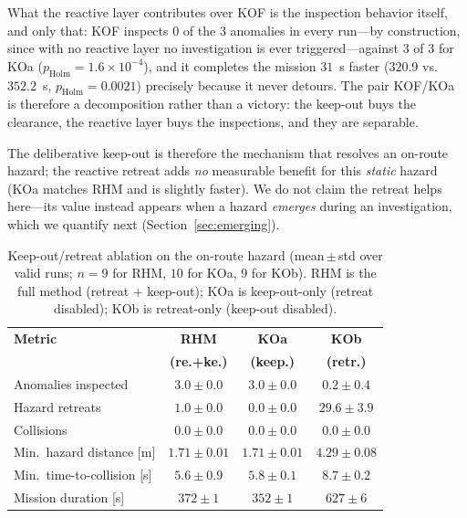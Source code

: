 What the reactive layer contributes over KOF is the inspection behavior itself, and
only that: KOF inspects $0$ of the $3$ anomalies in every run---by construction, since
with no reactive layer no investigation is ever triggered---against $3$ of $3$ for
KOa ($p_{\mathrm{Holm}}=1.6{\times}10^{-4}$), and it completes the mission $31$~s
faster ($320.9$ vs.\ $352.2$~s, $p_{\mathrm{Holm}}=0.0021$) precisely because it
never detours. The pair KOF/KOa is therefore a decomposition rather than a
victory: the keep-out buys the clearance, the reactive layer buys the inspections,
and they are separable.

The deliberative keep-out is therefore the mechanism that resolves
an on-route hazard; the reactive retreat adds \emph{no} measurable benefit for this
\emph{static} hazard (KOa matches RHM and is slightly faster). We do not claim the
retreat helps here---its value instead appears when a hazard \emph{emerges} during
an investigation, which we quantify next (Section~\ref{sec:emerging}).

\begin{table}[t]
\centering
\caption{Keep-out/retreat ablation on the on-route hazard (mean\,$\pm$\,std over
valid runs; $n=9$ for RHM, $10$ for KOa, $9$ for KOb). RHM is the full method
(retreat $+$ keep-out); KOa is keep-out-only (retreat disabled); KOb is retreat-only
(keep-out disabled).}
\label{tab:ablation}
\footnotesize
\setlength{\tabcolsep}{5pt}
\begin{tabular}{lccc}
\hline
\textbf{Metric} & \textbf{RHM} & \textbf{KOa} & \textbf{KOb}\\
 & \textbf{(re.+ke.)} & \textbf{(keep.)} & \textbf{(retr.)}\\
\hline
Anomalies inspected        & $3.0\pm0.0$   & $3.0\pm0.0$   & $0.2\pm0.4$\\
Hazard retreats            & $1.0\pm0.0$   & $0.0\pm0.0$   & $29.6\pm3.9$\\
Collisions                 & $0.0\pm0.0$   & $0.0\pm0.0$   & $0.0\pm0.0$\\
Min.\ hazard distance [m]  & $1.71\pm0.01$ & $1.71\pm0.01$ & $4.29\pm0.08$\\
Min.\ time-to-collision [s]& $5.6\pm0.9$   & $5.8\pm0.1$   & $8.7\pm0.2$\\
Mission duration [s]       & $372\pm1$     & $352\pm1$     & $627\pm6$\\
\hline
\end{tabular}
\end{table}

